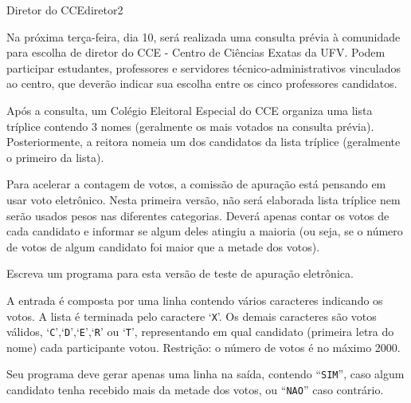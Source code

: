 \documentclass[12pt,a4paper,oneside]{article}
\begin{document}
\begin{problem}{Diretor do CCE}{diretor}{2}
 
Na próxima terça-feira, dia 10, será realizada uma consulta prévia à comunidade para escolha de diretor do CCE - Centro de Ciências Exatas da UFV. Podem participar  estudantes, professores e servidores técnico-administrativos vinculados ao centro, que deverão indicar sua escolha entre os cinco professores candidatos.%

Após a consulta, um Colégio Eleitoral Especial do CCE organiza uma lista tríplice contendo 3 nomes (geralmente os mais votados na consulta prévia). Posteriormente, a reitora nomeia um dos candidatos da lista tríplice (geralmente o primeiro da lista).

Para acelerar a contagem de votos, a comissão de apuração está pensando em usar voto eletrônico. Nesta primeira versão, não será elaborada lista tríplice nem serão usados pesos nas diferentes categorias. Deverá apenas contar os votos de cada candidato e informar se algum deles atingiu a maioria (ou seja, se o número de votos de algum candidato foi maior que a metade dos votos). 

Escreva um programa para esta versão de teste de apuração eletrônica.

%

\InputFile

A entrada é composta por uma linha contendo vários caracteres indicando os votos. A lista é terminada pelo caractere `\texttt{X}'. Os demais caracteres são votos válidos, `\texttt{C}',`\texttt{D}',`\texttt{E}',`\texttt{R}' ou `\texttt{T}', representando em qual candidato (primeira letra do nome) cada participante votou. Restrição: o número de votos é no máximo 2000.

\OutputFile

Seu programa deve gerar apenas uma linha na saída, contendo ``\texttt{SIM}'', caso algum candidato tenha recebido mais da metade dos votos, ou ``\texttt{NAO}'' caso contrário.



\Example

\begin{example}
%
\end{example}

\begin{example}
%
\end{example}


\end{problem}
\end{document}
